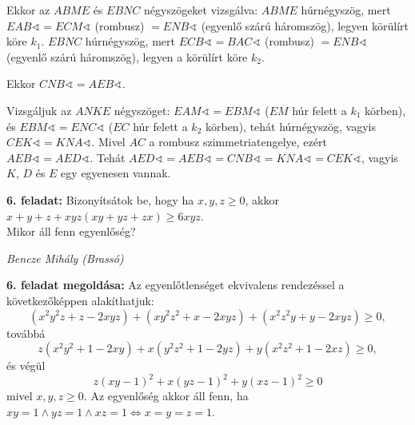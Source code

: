 \documentclass[a4paper,10pt]{article}
\def\ki#1#2{\hfill {\it #1 (#2)}\medskip}
\begin{document}
Ekkor az  $ABME$ és $EBNC$ négyszögeket vizsgálva: $ABME$ húrnégyszög, mert $EAB\sphericalangle=ECM\sphericalangle$
 (rombusz) $=ENB\sphericalangle$ (egyenlő szárú háromszög), legyen körülírt köre $k_1$.
 $EBNC$ húrnégyszög, mert $ECB\sphericalangle=BAC\sphericalangle$ (rombusz) $=ENB\sphericalangle$ (egyenlő szárú háromszög), legyen 
a körülírt köre $k_2$.

Ekkor $CNB\sphericalangle=AEB\sphericalangle$.

Vizsgáljuk az $ANKE$ négyszöget: $EAM\sphericalangle=EBM\sphericalangle$ ($EM$ húr felett a $k_1$ körben),
és $EBM\sphericalangle = ENC\sphericalangle$ ($EC$ húr felett a $k_2$ körben), 
tehát húrnégyszög, vagyis $CEK\sphericalangle=KNA\sphericalangle$. Mivel $AC$ a rombusz
szimmetriatengelye, ezért $AEB\sphericalangle=AED\sphericalangle$. Tehát
$AED\sphericalangle=AEB\sphericalangle=CNB\sphericalangle=KNA\sphericalangle=CEK\sphericalangle$, vagyis
$K$, $D$ és $E$ egy egyenesen vannak.

\medskip
{\bf 6. feladat: } Bizonyítsátok be, hogy ha $x, y, z\ge 0$, akkor 
$x+y+z+xyz(xy+yz+zx)\ge 6xyz$.\\ 
Mikor áll fenn egyenlőség? 

\ki{Bencze Mihály}{Brassó}\medskip

{\bf 6. feladat megoldása: } Az egyenlőtlenséget ekvivalens rendezéssel a következőképpen alakíthatjuk:
$$(x^2y^2z+z-2xyz)+(xy^2z^2+x-2xyz)+(x^2z^2y+y-2xyz)\ge 0,$$
továbbá
$$z(x^2y^2+1-2xy)+x(y^2z^2+1-2yz)+y(x^2z^2+1-2xz)\ge 0,$$
és végül
$$z(xy-1)^2+x(yz-1)^2+y(xz-1)^2\ge 0$$
mivel $x,y,z \ge 0$.
Az egyenlőség akkor áll fenn, ha $xy=1 \land yz=1 \land xz=1 \Leftrightarrow x=y=z=1$.
\end{document}
